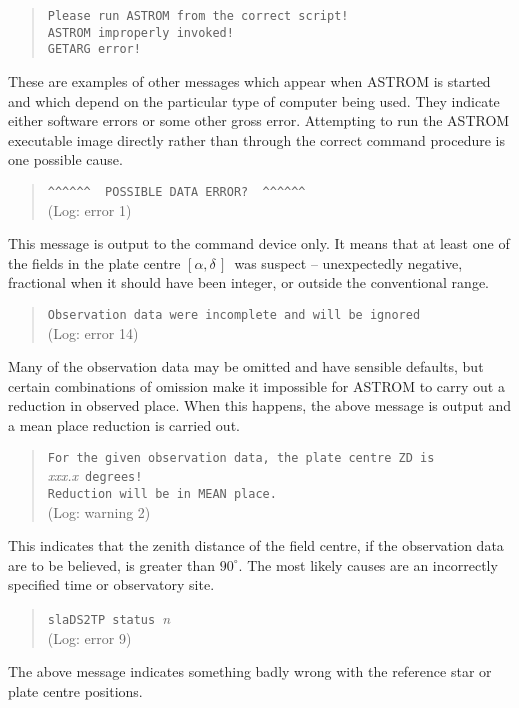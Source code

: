 \documentclass[twoside,11pt]{article}
\renewcommand{\_}{\texttt{\symbol{95}}}
\newcommand{\radec}     {$[\alpha,\delta\,]$}
\begin{document}
\begin{quote}
\texttt{Please run ASTROM from the correct script!}\\
\texttt{ASTROM improperly invoked!} \\
\texttt{GETARG error!}
\end{quote}

These are examples of other messages which appear when ASTROM is
started and which depend on the particular type of computer
being used.  They indicate either software errors or some
other gross error.  Attempting to run the ASTROM
executable image directly rather than through the correct
command procedure is one possible cause.

\begin{quote}
\verb|^^^^^^  POSSIBLE DATA ERROR?  ^^^^^^|\\
(Log: error 1)
\end{quote}
This message is output to the command device only.  It means that
at least one
of the fields in the plate centre \radec\ was suspect --
unexpectedly negative, fractional when it should have been
integer, or outside the conventional range.

\begin{quote}
\texttt{Observation data were incomplete and will be ignored}\\
(Log: error 14)
\end{quote}
Many of the observation data may be omitted and have sensible
defaults, but certain combinations of omission make it impossible
for ASTROM to carry out a reduction in observed place.  When this
happens, the above message is output and a mean place reduction
is carried out.

\begin{quote}
\texttt{For the given observation data, the plate centre ZD is}
\textit{xxx.x}\ \texttt{degrees!}\\
\texttt{Reduction will be in MEAN place.}\\
(Log: warning 2)
\end{quote}
This indicates that the
zenith distance of the field centre, if the observation data are to
be believed, is greater than $90^{\circ}$.  The most likely causes
are an incorrectly specified time or observatory site.

\begin{quote}
\texttt{sla\_DS2TP status }\textit{n}\\
(Log: error 9)
\end{quote}
The above message
indicates something badly wrong with the reference star or plate
centre positions.
\end{document}
